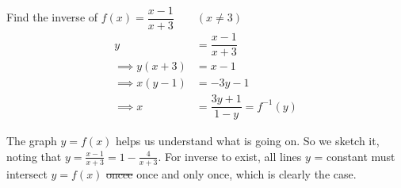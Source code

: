 \documentclass[10pt]{scrartcl}
\newcommand{\vasymptote}[2][]{
    \draw [densely dashed,#1] ({rel axis cs:0,0} -| {axis cs:#2,0}) -- ({rel axis cs:0,1} -| {axis cs:#2,0});
}
\begin{document}
\begin{example} Find the inverse of $f(x) = \dfrac{x-1}{x+3} \qquad (x \neq 3)$
\[
\begin{aligned}
  y &= \dfrac{x-1}{x+3}\\[0.2cm]
  \implies y(x+3) &= x-1\\
  \implies x(y-1) &= -3y-1 \\[0.2cm]
  \implies x &= \dfrac{3y+1}{1-y} = f^{-1}(y)
\end{aligned}
\]



\begin{center}
	

\end{center}
The graph $y = f(x)$ helps us understand what is going on. So we sketch it, noting that $y = \frac{x-1}{x+3} = 1 - \frac{4}{x+3}$. For inverse to exist, all lines $y$ = constant must intersect $y = f(x)$ \sout{oncee} once and only once, which is clearly the case.



\end{example}\vspace*{5pt}
\end{document}
